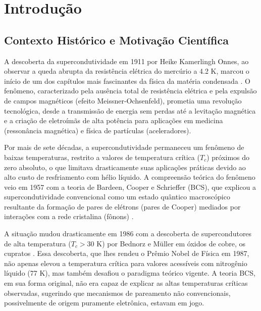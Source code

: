 \documentclass[12pt, a4paper, oneside]{report}
\begin{document}
\newpage\tableofcontents
\newpage\listoffigures
\newpage\listoftables

\chapter{Introdução}
\label{chap:introducao}

\section{Contexto Histórico e Motivação Científica}

A descoberta da supercondutividade em 1911 por Heike Kamerlingh Onnes, ao observar a queda abrupta da resistência elétrica do mercúrio a 4.2 K, marcou o início de um dos capítulos mais fascinantes da física da matéria condensada \cite{onnes1911}. O fenômeno, caracterizado pela ausência total de resistência elétrica e pela expulsão de campos magnéticos (efeito Meissner-Ochsenfeld), prometia uma revolução tecnológica, desde a transmissão de energia sem perdas até a levitação magnética e a criação de eletroímãs de alta potência para aplicações em medicina (ressonância magnética) e física de partículas (aceleradores).

Por mais de sete décadas, a supercondutividade permaneceu um fenômeno de baixas temperaturas, restrito a valores de temperatura crítica ($T_c$) próximos do zero absoluto, o que limitava drasticamente suas aplicações práticas devido ao alto custo de resfriamento com hélio líquido. A compreensão teórica do fenômeno veio em 1957 com a teoria de Bardeen, Cooper e Schrieffer (BCS), que explicou a supercondutividade convencional como um estado quântico macroscópico resultante da formação de pares de elétrons (pares de Cooper) mediados por interações com a rede cristalina (fônons) \cite{bcs1957}.

A situação mudou drasticamente em 1986 com a descoberta de supercondutores de alta temperatura ($T_c > 30$ K) por Bednorz e Müller em óxidos de cobre, os cupratos \cite{bednorz1986}. Essa descoberta, que lhes rendeu o Prêmio Nobel de Física em 1987, não apenas elevou a temperatura crítica para valores acessíveis com nitrogênio líquido (77 K), mas também desafiou o paradigma teórico vigente. A teoria BCS, em sua forma original, não era capaz de explicar as altas temperaturas críticas observadas, sugerindo que mecanismos de pareamento não convencionais, possivelmente de origem puramente eletrônica, estavam em jogo.
\end{document}
